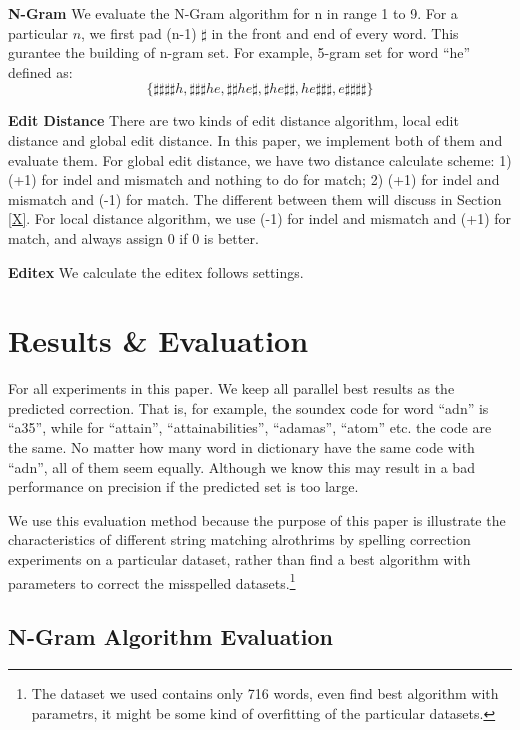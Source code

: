 \documentclass[11pt]{article}
\begin{document}
\noindent\textbf{N-Gram} We evaluate the N-Gram algorithm for n in range 1 to 9. For a particular $n$, we first pad (n-1) $\sharp$ in the front and end of every word. This gurantee the building of n-gram set. For example, 5-gram set for word ``he'' defined as: 
\begin{equation}
\{\sharp\sharp\sharp\sharp h, \sharp\sharp\sharp he, \sharp\sharp he\sharp, \sharp he\sharp\sharp, he\sharp\sharp\sharp, e\sharp\sharp\sharp\sharp\}
\end{equation}

\noindent\textbf{Edit Distance} There are two kinds of edit distance algorithm, local edit distance and global edit distance. In this paper,  we implement both of them and evaluate them. For global edit distance, we have two distance calculate scheme: 1) (+1) for indel and mismatch and nothing to do for match; 2) (+1) for indel and mismatch and (-1) for match. The different between them will discuss in Section \ref{X}. For local distance algorithm, we use (-1) for indel and mismatch and (+1) for match, and always assign 0 if 0 is better.

\noindent\textbf{Editex} We calculate the editex follows  \cite{Zobel1996PhoneticSM} settings.
 
\section{Results \& Evaluation}

For all experiments in this paper. We keep all parallel best results as the predicted correction. That is, for example, the soundex code for word ``adn'' is ``a35'', while for ``attain'', ``attainabilities'', ``adamas'', ``atom'' etc. the code are the same. No matter how many word in dictionary have the same code with ``adn'', all of them seem equally. Although we know this may result in a bad performance on precision if the predicted set is too large. 

We use this evaluation method because the purpose of this paper is illustrate the characteristics of different string matching alrothrims by spelling correction experiments on a particular dataset, rather than find a best algorithm with parameters to correct the misspelled datasets.\footnote{The dataset we used contains only 716 words, even find best algorithm with parametrs, it might be some kind of overfitting of the particular datasets.} 

\subsection{N-Gram Algorithm Evaluation}
\end{document}

